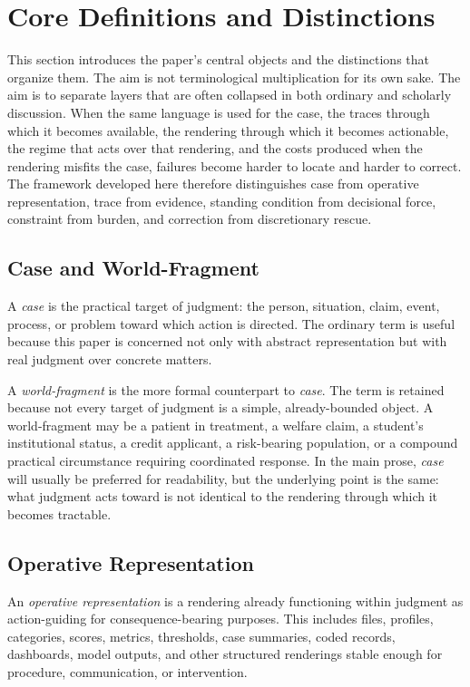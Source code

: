 \documentclass[11pt]{article}
\renewcommand{\emph}[1]{\textit{#1}}
\begin{document}
\section{Core Definitions and Distinctions}

This section introduces the paper's central objects and the distinctions that organize them. The aim is not terminological multiplication for its own sake. The aim is to separate layers that are often collapsed in both ordinary and scholarly discussion. When the same language is used for the case, the traces through which it becomes available, the rendering through which it becomes actionable, the regime that acts over that rendering, and the costs produced when the rendering misfits the case, failures become harder to locate and harder to correct. The framework developed here therefore distinguishes case from operative representation, trace from evidence, standing condition from decisional force, constraint from burden, and correction from discretionary rescue.

\subsection{Case and World-Fragment}

A \emph{case} is the practical target of judgment: the person, situation, claim, event, process, or problem toward which action is directed. The ordinary term is useful because this paper is concerned not only with abstract representation but with real judgment over concrete matters.

A \emph{world-fragment} is the more formal counterpart to \emph{case}. The term is retained because not every target of judgment is a simple, already-bounded object. A world-fragment may be a patient in treatment, a welfare claim, a student's institutional status, a credit applicant, a risk-bearing population, or a compound practical circumstance requiring coordinated response. In the main prose, \emph{case} will usually be preferred for readability, but the underlying point is the same: what judgment acts toward is not identical to the rendering through which it becomes tractable.

\subsection{Operative Representation}

An \emph{operative representation} is a rendering already functioning within judgment as action-guiding for consequence-bearing purposes. This includes files, profiles, categories, scores, metrics, thresholds, case summaries, coded records, dashboards, model outputs, and other structured renderings stable enough for procedure, communication, or intervention.\cite{BowkerStar1999SortingThingsOut,ONeil2016WeaponsMathDestruction}
\end{document}
